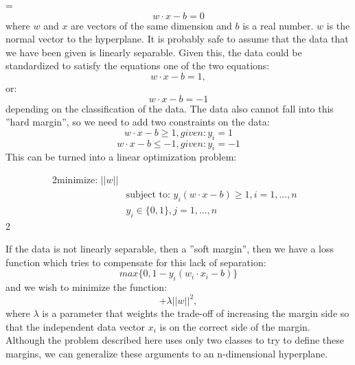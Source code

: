 \documentclass[titlepage, 12pt]{article}
\begin{document}
=\begin{equation}
    w\cdot x - b = 0
\end{equation}
where $w$ and $x$ are vectors of the same dimension and $b$ is a real number. $w$ is the normal vector to the hyperplane. It is probably safe to assume that the data that we have been given is linearly separable. Given this, the data could be standardized to satisfy the equations one of the two equations:
\begin{equation}
    w \cdot x - b = 1, 
\end{equation}
or:
\begin{equation}
    w \cdot x - b = -1
\end{equation}
depending on the classification of the data. The data also cannot fall into this ''hard margin'', so we need to add two constraints on the data:
\begin{equation}
    w \cdot x - b \geq 1, given: y_i = 1
\end{equation}
\begin{equation}
     w \cdot x - b \leq -1, given: y_i = -1
\end{equation}
This can be turned into a linear optimization problem:

\begin{alignat*}{2}
 \text{minimize: }  ||w||  &\\
  &\text{subject to: } \displaystyle y_i(w \cdot x - b) \geq 1, i=1 ,..., n &\\
        &y_{i} \in \{0,1\}, j=1 ,..., n
\end{alignat*}{2}

\hspace{0.5 cm}If the data is not linearly separable, then a ''soft margin'', then we have a loss function which tries to compensate for this lack of separation:
\begin{equation}
    max\{0, 1 - y_i(w_i \cdot x_i - b)\}
\end{equation}
and we wish to minimize the function:
\begin{equation}
    [\frac{1}{n}\sum_{i=1}^{n} max\{0, 1 - y_i(w_i \cdot x_i - b)\}]+\lambda||w||^2,
\end{equation}
where $\lambda$ is a parameter that weights the trade-off of increasing the margin side so that the independent data vector $x_i$ is on the correct side of the margin. Although the problem described here uses only two classes to try to define these margins, we can generalize these arguments to an n-dimensional hyperplane.
\end{document}
